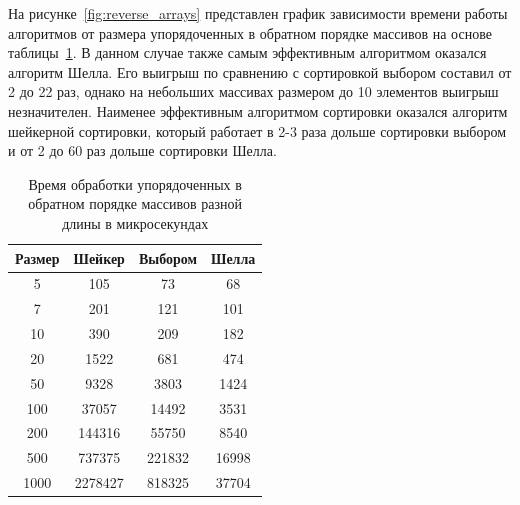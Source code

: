 \documentclass[12pt]{report}
\begin{document}
    На рисунке~\ref{fig:reverse_arrays} представлен график зависимости времени работы алгоритмов
    от размера упорядоченных в обратном порядке массивов на основе таблицы~\ref{tab:kontr_time}.
    В данном случае также самым эффективным алгоритмом оказался алгоритм Шелла.
    Его выигрыш по сравнению с сортировкой выбором составил от 2 до 22 раз,
    однако на небольших массивах размером до 10 элементов выигрыш незначителен.
    Наименее эффективным алгоритмом сортировки оказался алгоритм шейкерной сортировки,
    который работает в 2-3 раза дольше сортировки выбором и от 2 до 60 раз дольше сортировки Шелла.
    \begin{table}[H]
        \begin{center}
            \captionsetup{justification=raggedleft, singlelinecheck=false}
            \caption{\label{tab:kontr_time} Время обработки упорядоченных в обратном порядке массивов разной длины в микросекундах}
            \begin{tabular}{|c c c c|}
                \hline
                Размер & Шейкер  & Выбором & Шелла\\ [0.5ex]
                \hline
                5      & 105     & 73      & 68    \\
                \hline
                7      & 201     & 121     & 101   \\
                \hline
                10     & 390     & 209     & 182   \\
                \hline
                20     & 1522    & 681     & 474   \\
                \hline
                50     & 9328    & 3803    & 1424  \\
                \hline
                100    & 37057   & 14492   & 3531  \\
                \hline
                200    & 144316  & 55750   & 8540  \\
                \hline
                500    & 737375  & 221832  & 16998 \\
                \hline
                1000   & 2278427 & 818325  & 37704 \\
                \hline
            \end{tabular}
        \end{center}
    \end{table}
\end{document}
